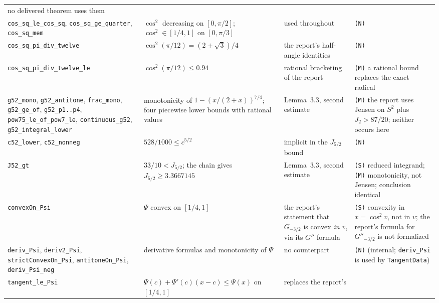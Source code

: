 \documentclass[11pt]{article}
\newcommand{\Ln}[1]{\texttt{#1}}
\newcommand{\No}{\texttt{(N)}}
\newcommand{\Sc}{\texttt{(S)}}
\newcommand{\Me}{\texttt{(M)}}
\begin{document}
{\begin{longtable}{L{3.7cm}L{4.2cm}L{3.4cm}L{4.7cm}}
no delivered theorem uses them\\
\Ln{cos\_\allowbreak{}sq\_\allowbreak{}le\_\allowbreak{}cos\_\allowbreak{}sq}, \Ln{cos\_\allowbreak{}sq\_\allowbreak{}ge\_\allowbreak{}quarter}, \Ln{cos\_\allowbreak{}sq\_\allowbreak{}mem} & $\cos^2$ decreasing on
$[0,\pi/2]$; $\cos^2\in[1/4,1]$ on $[0,\pi/3]$ & used throughout & \No\\
\Ln{cos\_\allowbreak{}sq\_\allowbreak{}pi\_\allowbreak{}div\_\allowbreak{}twelve} & $\cos^2(\pi/12)=(2+\sqrt3)/4$ & the report's half-angle identities
& \No\\
\Ln{cos\_\allowbreak{}sq\_\allowbreak{}pi\_\allowbreak{}div\_\allowbreak{}twelve\_\allowbreak{}le} & $\cos^2(\pi/12)\le0.94$ & rational bracketing of the report &
\Me{} a rational bound replaces the exact radical\\
\Ln{g52\_\allowbreak{}mono}, \Ln{g52\_\allowbreak{}antitone}, \Ln{frac\_\allowbreak{}mono}, \Ln{g52\_\allowbreak{}ge\_\allowbreak{}of}, \Ln{g52\_\allowbreak{}p1..p4},
\Ln{pow75\_\allowbreak{}le\_\allowbreak{}of\_\allowbreak{}pow7\_\allowbreak{}le}, \Ln{continuous\_\allowbreak{}g52}, \Ln{g52\_\allowbreak{}integral\_\allowbreak{}lower} & monotonicity of
$1-(x/(2+x))^{7/4}$; four piecewise lower bounds with rational values & Lemma~3.3, second
estimate & \Me{} the report uses Jensen on $S^2$ plus $J_2>87/20$; neither occurs here\\
\Ln{c52\_\allowbreak{}lower}, \Ln{c52\_\allowbreak{}nonneg} & $528/1000\le c^{5/2}$ & implicit in the $J_{5/2}$ bound &
\No\\
\Ln{J52\_\allowbreak{}gt} & $33/10<J_{5/2}$; the chain gives $J_{5/2}\ge3.3667145$ & Lemma~3.3, second
estimate & \Sc{} reduced integrand; \Me{} monotonicity, not Jensen; conclusion identical\\
\Ln{convexOn\_\allowbreak{}Psi} & $\Psi$ convex on $[1/4,1]$ & the report's statement that $G_{-3/2}$ is
convex \emph{in $v$}, via its $G''$ formula & \Sc{} convexity in $x=\cos^2v$, not in $v$; the
report's formula for $G''_{-3/2}$ is not formalized\\
\Ln{deriv\_\allowbreak{}Psi}, \Ln{deriv2\_\allowbreak{}Psi}, \Ln{strictConvexOn\_\allowbreak{}Psi}, \Ln{antitoneOn\_\allowbreak{}Psi},
\Ln{deriv\_\allowbreak{}Psi\_\allowbreak{}neg} & derivative formulas and monotonicity of $\Psi$ & no counterpart & \No{}
(internal; \Ln{deriv\_\allowbreak{}Psi} is used by \Ln{TangentData})\\
\Ln{tangent\_\allowbreak{}le\_\allowbreak{}Psi} & $\Psi(c)+\Psi'(c)(x-c)\le\Psi(x)$ on $[1/4,1]$ & replaces the report's

\end{longtable}}
\end{document}
